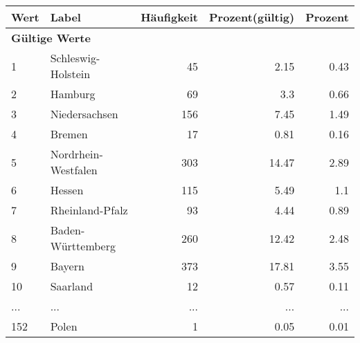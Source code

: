      \begin{longtable}{lXrrr}
     \toprule
     \textbf{Wert} & \textbf{Label} & \textbf{Häufigkeit} & \textbf{Prozent(gültig)} & \textbf{Prozent} \\
     \endhead
     \midrule
     \multicolumn{5}{l}{\textbf{Gültige Werte}}\\
        1 & \multicolumn{1}{X}{Schleswig-Holstein} & %
          \num{45} &
          \num[round-mode=places,round-precision=2]{2.15} &
          \num[round-mode=places,round-precision=2]{0.43} \\
        2 & \multicolumn{1}{X}{Hamburg} & %
          \num{69} &
          \num[round-mode=places,round-precision=2]{3.3} &
          \num[round-mode=places,round-precision=2]{0.66} \\
        3 & \multicolumn{1}{X}{Niedersachsen} & %
          \num{156} &
          \num[round-mode=places,round-precision=2]{7.45} &
          \num[round-mode=places,round-precision=2]{1.49} \\
        4 & \multicolumn{1}{X}{Bremen} & %
          \num{17} &
          \num[round-mode=places,round-precision=2]{0.81} &
          \num[round-mode=places,round-precision=2]{0.16} \\
        5 & \multicolumn{1}{X}{Nordrhein-Westfalen} & %
          \num{303} &
          \num[round-mode=places,round-precision=2]{14.47} &
          \num[round-mode=places,round-precision=2]{2.89} \\
        6 & \multicolumn{1}{X}{Hessen} & %
          \num{115} &
          \num[round-mode=places,round-precision=2]{5.49} &
          \num[round-mode=places,round-precision=2]{1.1} \\
        7 & \multicolumn{1}{X}{Rheinland-Pfalz} & %
          \num{93} &
          \num[round-mode=places,round-precision=2]{4.44} &
          \num[round-mode=places,round-precision=2]{0.89} \\
        8 & \multicolumn{1}{X}{Baden-Württemberg} & %
          \num{260} &
          \num[round-mode=places,round-precision=2]{12.42} &
          \num[round-mode=places,round-precision=2]{2.48} \\
        9 & \multicolumn{1}{X}{Bayern} & %
          \num{373} &
          \num[round-mode=places,round-precision=2]{17.81} &
          \num[round-mode=places,round-precision=2]{3.55} \\
        10 & \multicolumn{1}{X}{Saarland} & %
          \num{12} &
          \num[round-mode=places,round-precision=2]{0.57} &
          \num[round-mode=places,round-precision=2]{0.11} \\
       ... & ... & ... & ... & ... \\
        152 & \multicolumn{1}{X}{Polen} & %
          \num{1} &
          \num[round-mode=places,round-precision=2]{0.05} &
          \num[round-mode=places,round-precision=2]{0.01} \\


\end{longtable}
